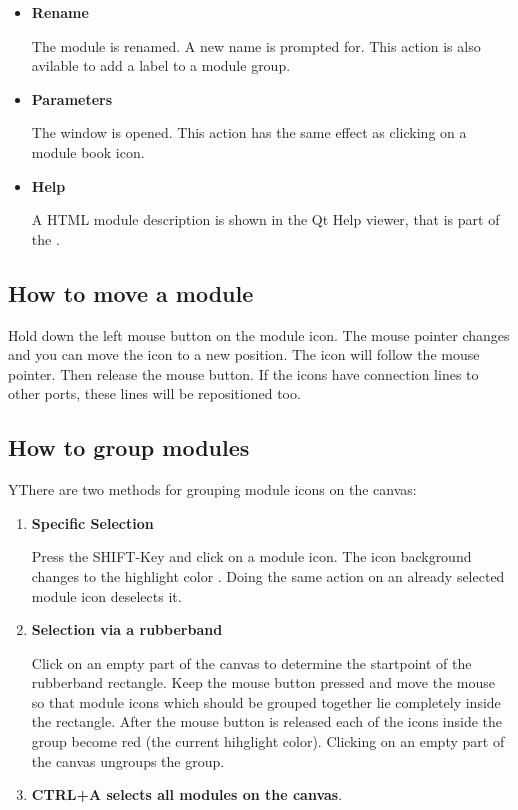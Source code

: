 \begin{itemize}
	 \item {\bf Rename}

	 The module is renamed. A new name is prompted for. This action is also avilable to add a label to a module group.
	 
	 \item {\bf Parameters} 

	 The \myparameter window is opened. This action has the same effect as clicking on a module book icon.

	 \item {\bf Help}

	 A HTML module description is shown in the Qt Help viewer, that is part of the {\mapeditor}. 

	 \end{itemize}





	 \subsection{How to move a module}

	 Hold down the left mouse button on the module icon.  The mouse pointer changes and you can move
	 the icon to a new position. The icon will follow the mouse pointer. Then release the mouse button. 
	 If the icons have connection lines to other ports, these lines will be repositioned too. 




	 \subsection{How to group modules}


	 YThere are two methods for grouping module icons on the canvas:

		 \begin{enumerate}
		 \item {\bf Specific Selection}

		 Press the SHIFT-Key and click on a module icon. The icon background changes to 
       the  highlight color . 
       Doing the same action on an already selected module icon deselects it.

		 \item {\bf Selection via a rubberband}

		 Click on an empty part of the canvas to determine the startpoint of the 
		 rubberband rectangle. Keep the mouse button pressed and move the mouse 
		 so that module icons which should be grouped together lie completely inside 
		 the rectangle. After the mouse button is released each of the icons inside the group
		 become red (the current hihglight color). Clicking on an empty part of the canvas ungroups the group. 
		 
       \item { \bf CTRL+A selects all modules on the canvas}.
		 \end{enumerate}


